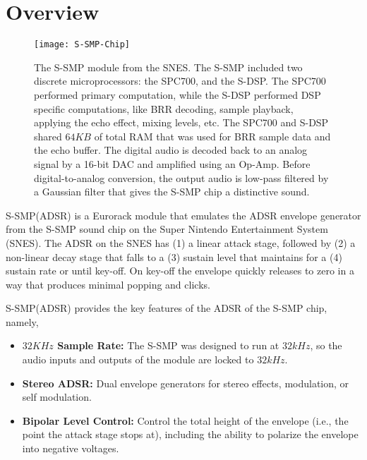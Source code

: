\documentclass[12pt,letter]{article}
\begin{document}


\section{Overview}

\begin{figure}[!htp]
\centering
\texttt{[image: S-SMP-Chip]}
\caption{The S-SMP module from the SNES. The S-SMP included two discrete microprocessors: the SPC700, and the S-DSP. The SPC700 performed primary computation, while the S-DSP performed DSP specific computations, like BRR decoding, sample playback, applying the echo effect, mixing levels, etc. The SPC700 and S-DSP shared $64KB$ of total RAM that was used for BRR sample data and the echo buffer. The digital audio is decoded back to an analog signal by a 16-bit DAC and amplified using an Op-Amp. Before digital-to-analog conversion, the output audio is low-pass filtered by a Gaussian filter that gives the S-SMP chip a distinctive sound.}
\end{figure}

\clearpage

S-SMP(ADSR) is a Eurorack module that emulates the ADSR envelope generator from the S-SMP sound chip on the Super Nintendo Entertainment System (SNES). The ADSR on the SNES has (1) a linear attack stage, followed by (2) a non-linear decay stage that falls to a (3) sustain level that maintains for a (4) sustain rate or until key-off. On key-off the envelope quickly releases to zero in a way that produces minimal popping and clicks.

S-SMP(ADSR) provides the key features of the ADSR of the S-SMP chip,
namely,
\begin{itemize}
  \item \textbf{$32KHz$ Sample Rate:} The S-SMP was designed to run at $32kHz$, so the audio inputs and outputs of the module are locked to $32kHz$.
  \item \textbf{Stereo ADSR:} Dual envelope generators for stereo effects, modulation, or self modulation.
  \item \textbf{Bipolar Level Control:} Control the total height of the envelope (i.e., the point the attack stage stops at), including the ability to polarize the envelope into negative voltages.
\end{itemize}
\end{document}

